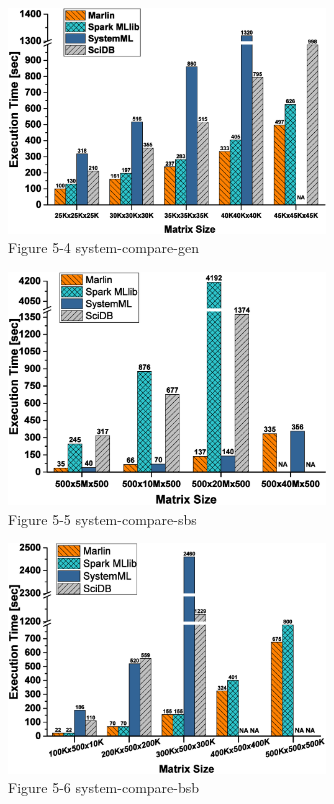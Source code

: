 \documentclass[onecolumn]{ieeetran}
\begin{document}
\begin{figure}[ht]
  \centering\captionsetup{justification=centering}
  \includegraphics[width=0.75\textwidth]{Figure_5-4_system-compare-gen.eps}
  \caption{Figure 5-4 system-compare-gen}\label{Figure_5-4_system-compare-gen}
\end{figure}

\begin{figure}[ht]
  \centering\captionsetup{justification=centering}
  \includegraphics[width=0.75\textwidth]{Figure_5-5_system-compare-sbs.eps}
  \caption{Figure 5-5 system-compare-sbs}\label{Figure_5-5_system-compare-sbs}
\end{figure}
\clearpage
\begin{figure}[ht]
  \centering\captionsetup{justification=centering}
  \includegraphics[width=0.75\textwidth]{Figure_5-6_system-compare-bsb.eps}
  \caption{Figure 5-6 system-compare-bsb}\label{Figure_5-6_system-compare-bsb}
\end{figure}
\end{document}
